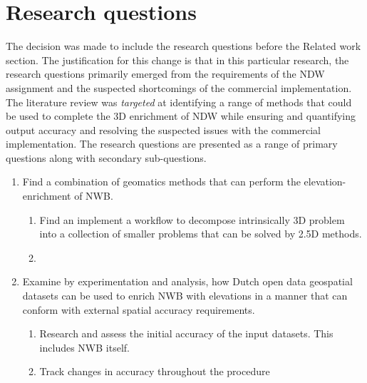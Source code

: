 
\chapter{Research questions}
\label{chap:rq}

The decision was made to include the research questions before the Related work section. The justification for this change is that in this particular research, the research questions primarily emerged from the requirements of the NDW assignment and the suspected shortcomings of the commercial implementation. The literature review was \textit{targeted} at identifying a range of methods that could be used to complete the 3D enrichment of NDW while ensuring and quantifying output accuracy and resolving the suspected issues with the commercial implementation. The research questions are presented as a range of primary questions along with secondary sub-questions.


\begin{enumerate}
\item Find a combination of geomatics methods that can perform the elevation-enrichment of NWB.
\begin{enumerate}
    \item Find an implement a workflow to decompose intrinsically 3D problem into a collection of smaller problems that can be solved by 2.5D methods.
    \item 
\end{enumerate}
\item Examine by experimentation and analysis, how Dutch open data geospatial datasets can be used to enrich NWB with elevations in a manner that can conform with external spatial accuracy requirements.
\begin{enumerate}
\item Research and assess the initial accuracy of the input datasets. This includes NWB itself.
\item Track changes in accuracy throughout the procedure
\end{enumerate}
\end{enumerate}